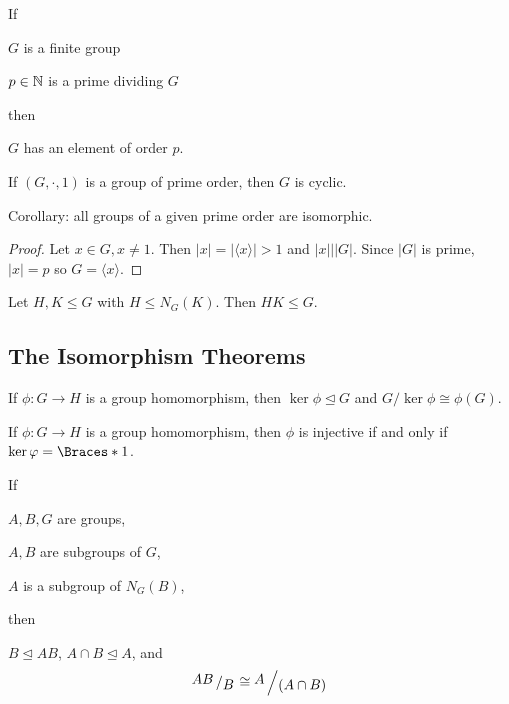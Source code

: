 \documentclass[a5paper]{article}
\begin{document}
\begin{theorem}
  If
  \begin{premises}
    \item $G$ is a finite group
    \item $p\in\mathbb{N}$ is a prime dividing $G$
  \end{premises}
  then
  \begin{conclusion}
    $G$ has an element of order $p$.
  \end{conclusion}
\end{theorem}

\begin{theorem}
	If $(G,\cdot,1)$ is a group of prime order, then $G$ is cyclic.

  Corollary: all groups of a given prime order are isomorphic.
\end{theorem}
\begin{proof}
  Let $x\in G,x\neq 1$. Then $|x|=|\langle x \rangle |>1$ and $|x|\big||G|$.
  Since $|G|$ is prime, $|x|=p$ so $G=\langle x \rangle$.
\end{proof}

\begin{lemma}
	Let $H,K\leqslant G$ with $H\leqslant N_G(K)$. Then $HK\leqslant G$.
\end{lemma}

\subsection{The Isomorphism Theorems}

\begin{theorem}
	If $\phi:G\to H$ is a group homomorphism, then $\ker\phi\trianglelefteq G$ and
  $G/\ker\phi\cong\phi(G)$. 
\end{theorem}

\begin{corollary}
	If $\phi:G\to H$ is a group homomorphism, then $\phi$ is injective if and only
  if $\ker\phi=\braces{1}$.
\end{corollary}

\begin{theorem}
  If
  \begin{premises}
    \item $A,B,G$ are groups,
    \item $A,B$ are subgroups of $G$,
    \item $A$ is a subgroup of $N_G(B)$,
  \end{premises}
  then
  \begin{conclusion}
    $B\trianglelefteq AB$, $A\cap B\trianglelefteq A$, and
    \begin{equation*}
      \quotient{AB}{B}\cong \quotient{A}{(A\cap B)}
    \end{equation*}
  \end{conclusion}
\end{theorem}
\end{document}
